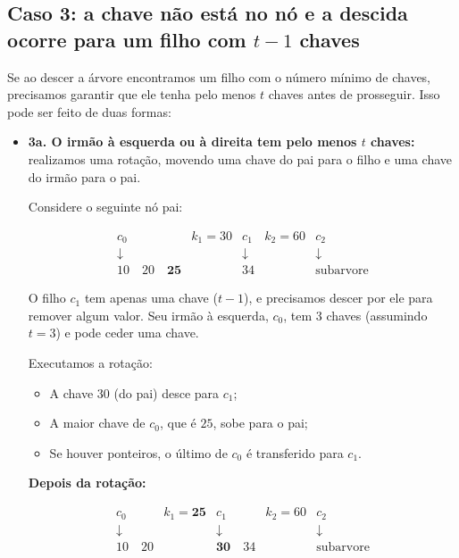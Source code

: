 \subsection*{Caso 3: a chave não está no nó e a descida ocorre para um filho com \( t - 1 \) chaves}

Se ao descer a árvore encontramos um filho com o número mínimo de chaves, precisamos garantir que ele tenha pelo menos \( t \) chaves antes de prosseguir. Isso pode ser feito de duas formas:

\begin{itemize}
  \item \textbf{3a. O irmão à esquerda ou à direita tem pelo menos \( t \) chaves:} realizamos uma rotação, movendo uma chave do pai para o filho e uma chave do irmão para o pai.

Considere o seguinte nó pai:

\[
\begin{array}{ccccccc}
  \boxed{c_0}      & k_1 = 30 & \boxed{c_1}        & k_2 = 60 & \boxed{c_2} \\
  \downarrow       &          & \downarrow         &          & \downarrow  \\
  \boxed{10 \quad 20 \quad \mathbf{25}} & & \boxed{34} & & \text{subarvore}
\end{array}
\]

O filho \( c_1 \) tem apenas uma chave (\( t - 1 \)), e precisamos descer por ele para remover algum valor. Seu irmão à esquerda, \( c_0 \), tem 3 chaves (assumindo \( t = 3 \)) e pode ceder uma chave.

Executamos a rotação:
\begin{itemize}
\item A chave \( 30 \) (do pai) desce para \( c_1 \);
\item A maior chave de \( c_0 \), que é \( 25 \), sobe para o pai;
\item Se houver ponteiros, o último de \( c_0 \) é transferido para \( c_1 \).
\end{itemize}

\textbf{Depois da rotação:}

\[
\begin{array}{ccccccc}
  \boxed{c_0}      & k_1 = \mathbf{25} & \boxed{c_1}         & k_2 = 60 & \boxed{c_2} \\
  \downarrow       &           & \downarrow          &          & \downarrow  \\
  \boxed{10 \quad 20} &         & \boxed{\mathbf{30} \quad 34} &        & \text{subarvore}
\end{array}
\]


\end{itemize}
